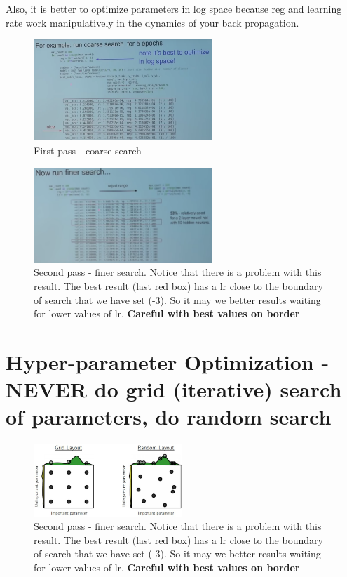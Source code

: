 Also, it is better to optimize parameters in log space because reg and learning rate work manipulatively in the dynamics of your back propagation.

\begin{figure}[h]
  \centering
  \includegraphics[width=0.6\textwidth]{Images/hyper_params_tun/3.png}
  \caption{First pass - coarse search}
\end{figure}

\begin{figure}[h]
  \centering
  \includegraphics[width=0.6\textwidth]{Images/hyper_params_tun/4.png}
  \caption{Second pass - finer search. Notice that there is a problem with this result. The best result (last red box) has a lr close to the boundary of search that we have set (-3). So it may we better results waiting for lower values of lr. \textbf{Careful with best values on border}}
\end{figure}


\section*{Hyper-parameter Optimization - NEVER do grid (iterative) search of parameters, do random search}

\begin{figure}[h]
  \centering
  \includegraphics[width=0.5\textwidth]{Images/hyper_params_tun/5.jpeg}
  \caption{Second pass - finer search. Notice that there is a problem with this result. The best result (last red box) has a lr close to the boundary of search that we have set (-3). So it may we better results waiting for lower values of lr. \textbf{Careful with best values on border}}
\end{figure}

